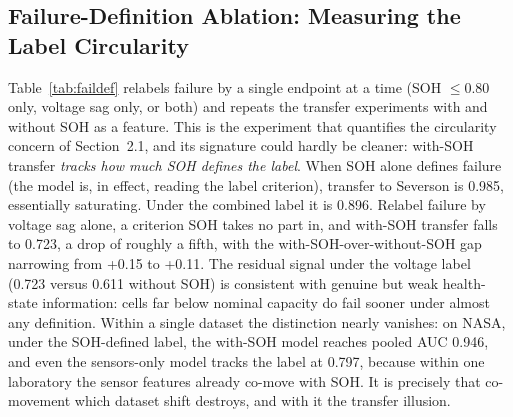 \documentclass[IJPHM, 2014, 00]{PHMSociety}
\begin{document}
\subsection{Failure-Definition Ablation: Measuring the Label Circularity}
Table~\ref{tab:faildef} relabels failure by a single endpoint at a time (SOH $\le 0.80$ only, voltage sag only, or both) and repeats the transfer experiments with and without SOH as a feature. This is the experiment that quantifies the circularity concern of Section~2.1, and its signature could hardly be cleaner: with-SOH transfer \emph{tracks how much SOH defines the label}. When SOH alone defines failure (the model is, in effect, reading the label criterion), transfer to Severson is 0.985, essentially saturating. Under the combined label it is 0.896. Relabel failure by voltage sag alone, a criterion SOH takes no part in, and with-SOH transfer falls to 0.723, a drop of roughly a fifth, with the with-SOH-over-without-SOH gap narrowing from +0.15 to +0.11. The residual signal under the voltage label (0.723 versus 0.611 without SOH) is consistent with genuine but weak health-state information: cells far below nominal capacity do fail sooner under almost any definition. Within a single dataset the distinction nearly vanishes: on NASA, under the SOH-defined label, the with-SOH model reaches pooled AUC 0.946, and even the sensors-only model tracks the label at 0.797, because within one laboratory the sensor features already co-move with SOH. It is precisely that co-movement which dataset shift destroys, and with it the transfer illusion.

\begin{table}[!t]
\caption{Failure-Definition Ablation at H=20 (XGBoost, ALL-LCO Source, Pooled AUC [CI]): Transfer With and Without SOH as a Feature, for Three Label Endpoints.}
\label{tab:faildef}
\centering
{}
\end{table}
\end{document}
